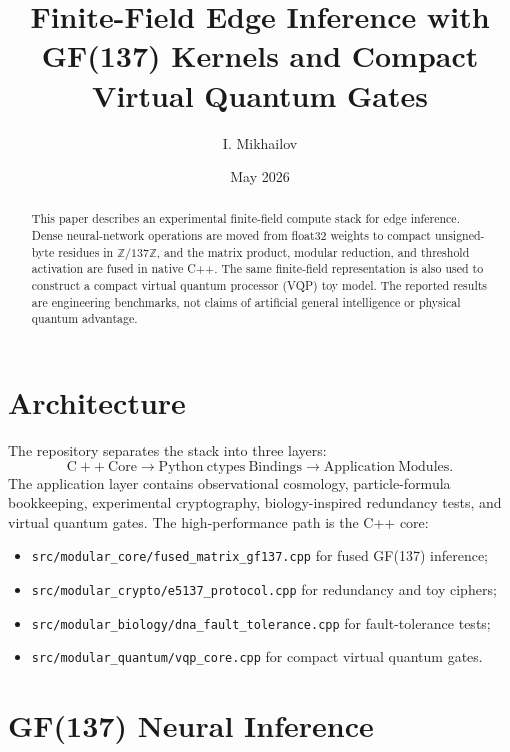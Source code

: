 \documentclass[11pt]{article}
\title{Finite-Field Edge Inference with GF(137) Kernels and Compact Virtual Quantum Gates}
\author{I. Mikhailov}
\date{May 2026}
\begin{document}
\maketitle

\begin{abstract}
This paper describes an experimental finite-field compute stack for edge
inference.  Dense neural-network operations are moved from float32 weights to
compact unsigned-byte residues in $\mathbb{Z}/137\mathbb{Z}$, and the matrix
product, modular reduction, and threshold activation are fused in native C++.
The same finite-field representation is also used to construct a compact
virtual quantum processor (VQP) toy model.  The reported results are
engineering benchmarks, not claims of artificial general intelligence or
physical quantum advantage.
\end{abstract}

\section{Architecture}

The repository separates the stack into three layers:
\begin{equation}
    \mathrm{C++~Core}
    \rightarrow
    \mathrm{Python~ctypes~Bindings}
    \rightarrow
    \mathrm{Application~Modules}.
\end{equation}
The application layer contains observational cosmology, particle-formula
bookkeeping, experimental cryptography, biology-inspired redundancy tests, and
virtual quantum gates.  The high-performance path is the C++ core:
\begin{itemize}
\item \texttt{src/modular\_core/fused\_matrix\_gf137.cpp} for fused GF(137) inference;
\item \texttt{src/modular\_crypto/e5137\_protocol.cpp} for redundancy and toy ciphers;
\item \texttt{src/modular\_biology/dna\_fault\_tolerance.cpp} for fault-tolerance tests;
\item \texttt{src/modular\_quantum/vqp\_core.cpp} for compact virtual quantum gates.
\end{itemize}

\section{GF(137) Neural Inference}
\end{document}
